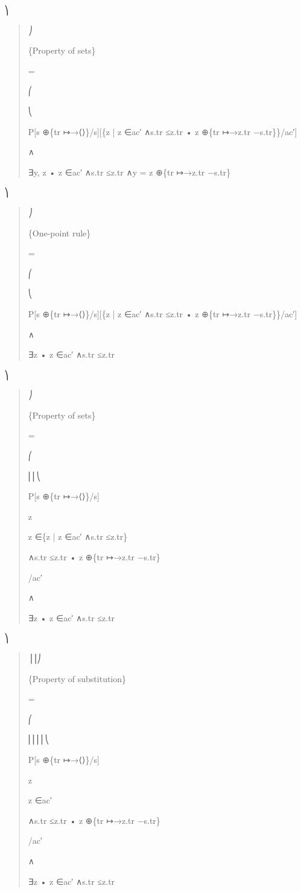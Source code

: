 \documentclass[11pt]{article}
\begin{document}
⎞

\begin{quote}\small\raggedright
⎠
\par
\{Property of sets\}
\par
=
\par
⎛
\par
⎝
\par
P[s ⊕\{tr ↦→⟨⟩\}/s][\{z | z ∈ac′ ∧s.tr ≤z.tr • z ⊕\{tr ↦→z.tr −s.tr\}\}/ac′]
\par
∧
\par
∃y, z • z ∈ac′ ∧s.tr ≤z.tr ∧y = z ⊕\{tr ↦→z.tr −s.tr\}
\end{quote}

⎞

\begin{quote}\small\raggedright
⎠
\par
\{One-point rule\}
\par
=
\par
⎛
\par
⎝
\par
P[s ⊕\{tr ↦→⟨⟩\}/s][\{z | z ∈ac′ ∧s.tr ≤z.tr • z ⊕\{tr ↦→z.tr −s.tr\}\}/ac′]
\par
∧
\par
∃z • z ∈ac′ ∧s.tr ≤z.tr
\end{quote}

⎞

\begin{quote}\small\raggedright
⎠
\par
\{Property of sets\}
\par
=
\par
⎛
\par
⎜⎜⎝
\par
P[s ⊕\{tr ↦→⟨⟩\}/s]
\par
z
\par
z ∈\{z | z ∈ac′ ∧s.tr ≤z.tr\}
\par
∧s.tr ≤z.tr • z ⊕\{tr ↦→z.tr −s.tr\}
\par
/ac′
\par
∧
\par
∃z • z ∈ac′ ∧s.tr ≤z.tr
\end{quote}

⎞

\begin{quote}\small\raggedright
⎟⎟⎠
\par
\{Property of substitution\}
\par
=
\par
⎛
\par
⎜⎜⎜⎜⎝
\par
P[s ⊕\{tr ↦→⟨⟩\}/s]
\par
z
\par
z ∈ac′
\par
∧s.tr ≤z.tr • z ⊕\{tr ↦→z.tr −s.tr\}
\par
/ac′
\par
[\{z | z ∈ac′ ∧s.tr ≤z.tr\}/ac′]
\par
∧
\par
∃z • z ∈ac′ ∧s.tr ≤z.tr
\end{quote}
\end{document}
